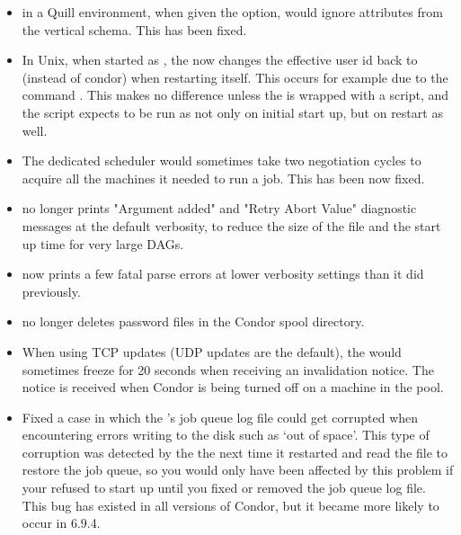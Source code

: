 \begin{itemize}
\item {} in a Quill environment,
  when given the  option,
  would ignore attributes from the vertical schema.  This has been fixed.

\item In Unix, when started as ,
  the  now changes the
  effective user id back to  (instead of condor)
  when restarting itself.
  This occurs for example due to the command .
  This makes no difference unless the  is wrapped
  with a script, and the script expects to be run as 
  not only on initial start up, but on restart as well.

\item The dedicated scheduler would sometimes take two negotiation cycles
  to acquire all the machines it needed to run a job.
  This has been now fixed.

\item {} no longer prints "Argument added" and
  "Retry Abort Value" diagnostic messages at the default verbosity,
  to reduce the size of the  file and the start up time
  for very large DAGs.

\item {} now prints a few fatal parse errors at lower
  verbosity settings than it did previously.

\item {} no longer deletes  password files in the
  Condor spool directory.

\item When using TCP updates (UDP updates are the default), the
   would sometimes freeze for 20 seconds when
  receiving an invalidation notice.  
  The notice is received when Condor is being turned off
  on a machine in the pool.

\item Fixed a case in which the 's job queue log file
could get corrupted when encountering errors writing to the disk such
as `out of space'.  This type of corruption was detected by the
 the next time it restarted and read the file to
restore the job queue, so you would only have been affected by this
problem if your  refused to start up until you fixed or
removed the job queue log file.  This bug has existed in all versions
of Condor, but it became more likely to occur in 6.9.4.


\end{itemize}
